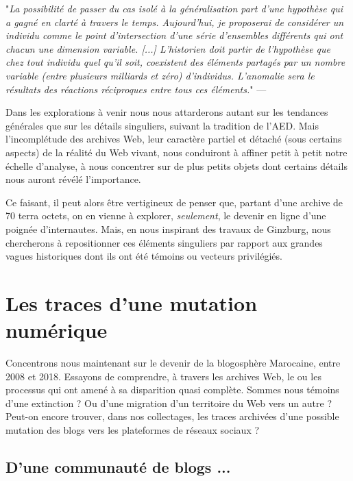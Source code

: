 \documentclass[symmetric,justified,marginals=raggedouter]{tufte-book}
\begin{document}
\begin{fullwidth}
"\textit{La possibilité de passer du cas isolé à la généralisation part d'une hypothèse qui a gagné en clarté à travers le temps. Aujourd'hui, je proposerai de considérer un individu comme le point d'intersection d'une série d'ensembles différents qui ont chacun une dimension variable. [...] L'historien doit partir de l'hypothèse que chez tout individu quel qu'il soit, coexistent des éléments partagés par un nombre variable (entre plusieurs milliards et zéro) d'individus. L'anomalie sera le résultats des réactions réciproques entre tous ces éléments.}" --- \citep[p359-360]{ginzburg_mythes_2012}\\
\end{fullwidth} 

\noindent Dans les explorations à venir nous nous attarderons autant sur les tendances générales que sur les détails singuliers, suivant la tradition de l'AED. Mais l'incomplétude des archives Web, leur caractère partiel et détaché (sous certains aspects) de la réalité du Web vivant, nous conduiront à affiner petit à petit notre échelle d'analyse, à nous concentrer sur de plus petits objets dont certains détails nous auront révélé l'importance. 

Ce faisant, il peut alors être vertigineux de penser que, partant d'une archive de 70 terra octets, on en vienne à explorer, \textit{seulement}, le devenir en ligne d'une poignée d'internautes. Mais, en nous inspirant des travaux de Ginzburg, nous chercherons à repositionner ces éléments singuliers par rapport aux grandes vagues historiques dont ils ont été témoins ou vecteurs privilégiés. 

\section{Les traces d'une mutation numérique}
\label{sec:6_blogs}

\noindent Concentrons nous maintenant sur le devenir de la blogosphère Marocaine, entre 2008 et 2018. Essayons de comprendre, à travers les archives Web, le ou les processus qui ont amené à sa disparition quasi complète. Sommes nous témoins d'une extinction ? Ou d'une migration d'un territoire du Web vers un autre ? Peut-on encore trouver, dans nos collectages, les traces archivées d'une possible mutation des blogs vers les plateformes de réseaux sociaux ? 

\subsection{D'une communauté de blogs ...}
\end{document}
